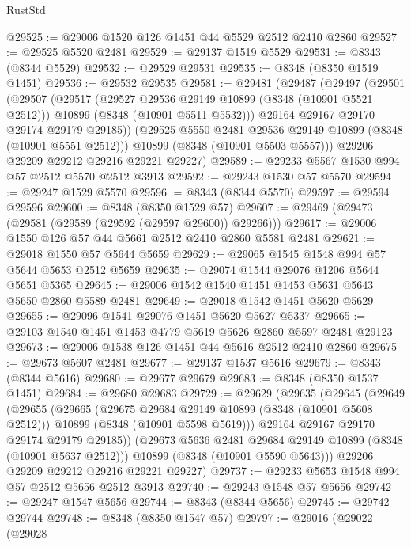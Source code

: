 \begin{lexlean}{RustStd}
\begin{coremodule}
@29525 := @29006 @1520 @126 @1451 @44 @5529 @2512 @2410 @2860
@29527 := @29525 @5520 @2481
@29529 := @29137 @1519 @5529
@29531 := @8343 (@8344 @5529)
@29532 := @29529 @29531
@29535 := @8348 (@8350 @1519 @1451)
@29536 := @29532 @29535
@29581 := @29481
    (@29487
      (@29497
        (@29501
          (@29507
            (@29517
              (@29527 @29536 @29149 @10899 (@8348 (@10901 @5521 @2512)))
              @10899
              (@8348 (@10901 @5511 @5532)))
            @29164
            @29167
            @29170
            @29174
            @29179
            @29185))
        (@29525 @5550 @2481 @29536 @29149 @10899 (@8348 (@10901 @5551 @2512)))
        @10899
        (@8348 (@10901 @5503 @5557)))
      @29206
      @29209
      @29212
      @29216
      @29221
      @29227)
@29589 := @29233 @5567 @1530 @994 @57 @2512 @5570 @2512 @3913
@29592 := @29243 @1530 @57 @5570
@29594 := @29247 @1529 @5570
@29596 := @8343 (@8344 @5570)
@29597 := @29594 @29596
@29600 := @8348 (@8350 @1529 @57)
@29607 := @29469 (@29473 (@29581 (@29589 (@29592 (@29597 @29600)) @29266)))
@29617 := @29006 @1550 @126 @57 @44 @5661 @2512 @2410 @2860 @5581 @2481
@29621 := @29018 @1550 @57 @5644 @5659
@29629 := @29065 @1545 @1548 @994 @57 @5644 @5653 @2512 @5659
@29635 := @29074 @1544 @29076 @1206 @5644 @5651 @5365
@29645 := @29006 @1542 @1540 @1451 @1453 @5631 @5643 @5650 @2860 @5589 @2481
@29649 := @29018 @1542 @1451 @5620 @5629
@29655 := @29096 @1541 @29076 @1451 @5620 @5627 @5337
@29665 := @29103 @1540 @1451 @1453 @4779 @5619 @5626 @2860 @5597 @2481 @29123
@29673 := @29006 @1538 @126 @1451 @44 @5616 @2512 @2410 @2860
@29675 := @29673 @5607 @2481
@29677 := @29137 @1537 @5616
@29679 := @8343 (@8344 @5616)
@29680 := @29677 @29679
@29683 := @8348 (@8350 @1537 @1451)
@29684 := @29680 @29683
@29729 := @29629
    (@29635
      (@29645
        (@29649
          (@29655
            (@29665
              (@29675 @29684 @29149 @10899 (@8348 (@10901 @5608 @2512)))
              @10899
              (@8348 (@10901 @5598 @5619)))
            @29164
            @29167
            @29170
            @29174
            @29179
            @29185))
        (@29673 @5636 @2481 @29684 @29149 @10899 (@8348 (@10901 @5637 @2512)))
        @10899
        (@8348 (@10901 @5590 @5643)))
      @29206
      @29209
      @29212
      @29216
      @29221
      @29227)
@29737 := @29233 @5653 @1548 @994 @57 @2512 @5656 @2512 @3913
@29740 := @29243 @1548 @57 @5656
@29742 := @29247 @1547 @5656
@29744 := @8343 (@8344 @5656)
@29745 := @29742 @29744
@29748 := @8348 (@8350 @1547 @57)
@29797 := @29016
    (@29022
      (@29028

\end{coremodule}
\end{lexlean}
